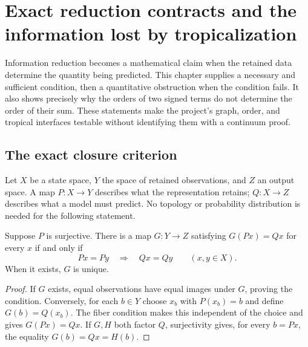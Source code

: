 \chapter{Exact reduction contracts and the information lost by tropicalization}
\label{ch:reduction-contracts}


Information reduction becomes a mathematical claim when the retained data
determine the quantity being predicted. This chapter supplies a necessary and
sufficient condition, then a quantitative obstruction when the condition fails.
It also shows precisely why the orders of two signed terms do not determine
the order of their sum. These statements make the project's graph, order, and
tropical interfaces testable without identifying them with a continuum proof.

\section{The exact closure criterion}

Let $X$ be a state space, $Y$ the space of retained observations, and $Z$ an
output space. A map $P:X\to Y$ describes what the representation retains;
$Q:X\to Z$ describes what a model must predict. No topology or probability
distribution is needed for the following statement.

\begin{theorem}
\label{thm:reduction-fiber-factorization}
Suppose $P$ is surjective. There is a map $G:Y\to Z$ satisfying
$G(Px)=Qx$ for every $x$ if and only if
\[
 Px=Py\quad\Longrightarrow\quad Qx=Qy
 \qquad(x,y\in X).
\]
When it exists, $G$ is unique.
\end{theorem}
\begin{proof}
If $G$ exists, equal observations have equal images under $G$, proving the
condition. Conversely, for each $b\in Y$ choose $x_b$ with $P(x_b)=b$ and
define $G(b)=Q(x_b)$. The fiber condition makes this independent of the
choice and gives $G(Px)=Qx$. If $G,H$ both factor $Q$, surjectivity gives,
for every $b=Px$, the equality $G(b)=Qx=H(b)$.
\end{proof}

